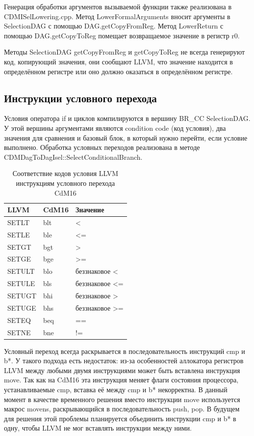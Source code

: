 \documentclass[a4paper,14pt]{extarticle}
\begin{document}
Генерация обработки аргументов вызываемой функции также реализована в CDMISelLowering.cpp. Метод LowerFormalArguments вносит аргументы в SelectionDAG с помощью DAG.getCopyFromReg. Метод LowerReturn с помощью DAG.getCopyToReg помещает возвращаемое значение в регистр r0.

Методы SelectionDAG getCopyFromReg и getCopyToReg не всегда генерируют код, копирующий значения, они сообщают LLVM, что значение находится в определённом регистре или оно должно оказаться в определённом регистре.


\subsection{Инструкции условного перехода}

Условия оператора if и циклов компилируются в вершину BR\_CC SelectionDAG. У этой вершины аргументами являются condition code (код условия), два значения для сравнения и базовый блок, в который нужно перейти, если условие выполнено. Обработка условных переходов реализована в методе CDMDagToDagIsel::SelectConditionalBranch.
\begin{table}[!h]
	\begin{center}
		\begin{tabular}{ |l|l|l|  }
			\hline
			LLVM & CdM16 & Значение \\
			\hline
			SETLT & blt & < \\
			SETLE & ble & <= \\
			SETGT & bgt & > \\
			SETGE & bge & >= \\
			SETULT & blo & беззнаковое < \\
			SETULE & bls & беззнаковое <= \\
			SETUGT & bhi & беззнаковое > \\
			SETUGE & bhs & беззнаковое >= \\
			SETEQ & beq & ==\\
			SETNE & bne & != \\

			\hline
		\end{tabular}
		\caption{Соответствие кодов условия LLVM инструкциям условного перехода CdM16}
	\end{center}
\end{table}
Условный переход всегда раскрывается в последовательность инструкций cmp и b*. У такого подхода есть недостаток: из-за особенностей аллокатора регистров LLVM между любыми двумя инструкциями может быть вставлена инструкция move. Так как на CdM16 эта инструкция меняет флаги состояния процессора, устанавливаемые cmp, вставка её между cmp и b* некорректна. В данный момент в качестве временного решения вместо инструкции move используется макрос movens, раскрывающийся в последовательность push, pop. В будущем для решения этой проблемы планируется %
объединить инструкции cmp и b* в одну, чтобы LLVM не мог вставлять инструкции между ними.
\end{document}

